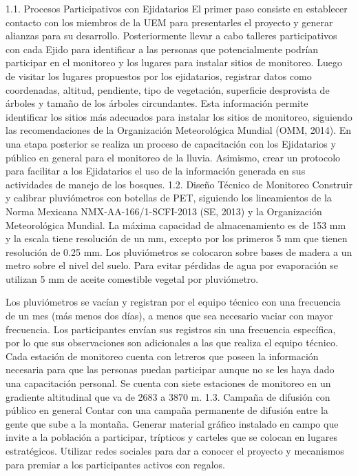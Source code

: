 1.1. Procesos Participativos con Ejidatarios 
El primer paso consiste en establecer contacto con los miembros de la UEM para presentarles el proyecto y generar alianzas para su desarrollo. Posteriormente llevar  a cabo talleres participativos con cada Ejido para identificar a las personas que potencialmente podrían participar en el monitoreo y los lugares para instalar sitios de monitoreo. Luego de visitar los lugares propuestos por los ejidatarios, registrar datos como coordenadas, altitud, pendiente, tipo de vegetación, superficie desprovista de árboles y tamaño de los árboles circundantes. Esta información permite identificar los sitios más adecuados para instalar los sitios de monitoreo, siguiendo las recomendaciones de la Organización Meteorológica Mundial (OMM, 2014). En una etapa posterior se realiza un proceso de capacitación con los Ejidatarios y público en general para el monitoreo de la lluvia. Asimismo, crear un protocolo para facilitar a los Ejidatarios el uso de la información generada en sus actividades de manejo de los bosques.
1.2. Diseño Técnico de Monitoreo
Construir y calibrar pluviómetros con botellas de PET, siguiendo los lineamientos de la Norma Mexicana NMX-AA-166/1-SCFI-2013 (SE, 2013) y la Organización Meteorológica Mundial. La máxima capacidad de almacenamiento es de 153 mm y la escala tiene resolución de un mm, excepto por los primeros 5 mm que tienen resolución de 0.25 mm. Los pluviómetros se colocaron sobre bases de madera a un metro sobre el nivel del suelo. Para evitar pérdidas de agua por evaporación se utilizan 5 mm de aceite comestible vegetal por pluviómetro.

Los pluviómetros se vacían y registran por el equipo técnico con una frecuencia de un mes (más menos dos días), a menos que sea necesario vaciar con mayor frecuencia. Los participantes envían sus registros sin una frecuencia específica, por lo que sus observaciones son adicionales a las que realiza el equipo técnico. Cada estación de monitoreo cuenta con letreros que poseen la información necesaria para que las personas puedan participar aunque no se les haya dado una capacitación personal. Se cuenta con siete estaciones de monitoreo en un gradiente altitudinal que va de 2683 a 3870 m. 
1.3. Campaña de difusión con público en general
Contar con una campaña permanente de difusión entre la gente que sube a la montaña. Generar material gráfico instalado en campo que invite a la población a participar, trípticos y carteles que se colocan en lugares estratégicos. Utilizar redes sociales para dar a conocer el proyecto y mecanismos para premiar a los participantes activos con regalos. 














